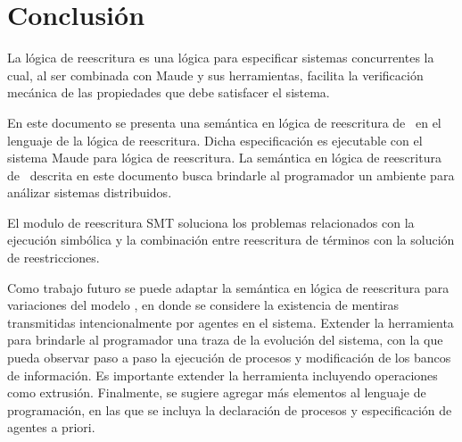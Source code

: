 
\chapter{Conclusi\'on}
\label{c.conclu}

La l\'ogica de reescritura es una l\'ogica para especificar sistemas concurrentes la cual, al ser combinada con Maude y sus herramientas, facilita la verificaci\'on mec\'anica de las propiedades que debe satisfacer el sistema.

En este documento se presenta una sem\'antica en l\'ogica de reescritura de \SCCP \ en el lenguaje de la l\'ogica de reescritura. Dicha especificaci\'on es ejecutable con el sistema Maude para l\'ogica de reescritura. La sem\'antica en l\'ogica de reescritura de \SCCP \ descrita en este documento busca brindarle al programador un ambiente para an\'alizar sistemas distribuidos. 

El modulo de reescritura SMT soluciona los problemas relacionados con la ejecuci\'on simb\'olica y la combinaci\'on entre reescritura de t\'erminos con la soluci\'on de reestricciones.

Como trabajo futuro se puede adaptar la sem\'antica en l\'ogica de reescritura para variaciones del modelo \SCCP, en donde se considere la existencia de mentiras transmitidas intencionalmente por agentes en el sistema. Extender la herramienta para brindarle al programador una traza de la evoluci\'on del sistema, con la que pueda observar paso a paso la ejecuci\'on de procesos y modificaci\'on de los bancos de informaci\'on. Es importante extender la herramienta incluyendo operaciones como extrusi\'on. Finalmente, se sugiere agregar m\'as elementos al lenguaje de programaci\'on, en las que se incluya la declaraci\'on de procesos y especificaci\'on de agentes a priori. 